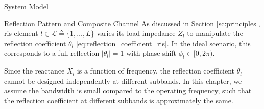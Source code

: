 \begin{section}{System Model}
	\begin{subsection}{Reflection Pattern and Composite Channel}\label{sc:reflection_pattern}
		As discussed in Section \ref{sc:principles}, \gls{ris} element $l \in \mathcal{L} \triangleq \{1, \dots, L\}$ varies its load impedance $Z_l$ to manipulate the reflection coefficient $\theta_l$ \eqref{eq:reflection_coefficient_ris}.
		In the ideal scenario, this corresponds to a full reflection $\lvert \theta_l \rvert = 1$ with phase shift $\phi_l \in [0,2\pi)$.



		\begin{remark}\label{re:reflection_coefficient}
			Since the reactance $X_l$ is a function of frequency, the reflection coefficient $\theta_l$ cannot be designed independently at different subbands. In this chapter, we assume the bandwidth is small compared to the operating frequency, such that the reflection coefficient at different subbands is approximately the same.
		\end{remark}


\end{subsection}
\end{section}
